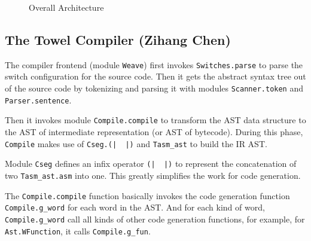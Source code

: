\documentclass{report}
\newcommand{\mtilde}[1]{\textasciitilde}
\begin{document}
\begin{figure}[H]
  \centering
  
  \caption{Overall Architecture}
  \label{fig:overall}
\end{figure}

\subsection{The Towel Compiler (Zihang Chen)}

  The compiler frontend (module \texttt{Weave}) first invokes \texttt{Switches.parse} to parse the switch configuration for the source code. Then it gets the abstract syntax tree out of the source code by tokenizing and parsing it with modules \texttt{Scanner.token} and \texttt{Parser.sentence}.

  Then it invokes module \texttt{Compile.compile} to transform the AST data structure to the AST of intermediate representation (or AST of bytecode). During this phase, \texttt{Compile} makes use of \texttt{Cseg.(|\mtilde ~\mtilde ~|)} and \texttt{Tasm\_ast} to build the IR AST.

  \begin{mdframed}[style=detail]
    Module \texttt{Cseg} defines an infix operator \texttt{(|\mtilde ~\mtilde ~|)} to represent the concatenation of two \texttt{Tasm\_ast.asm} into one. This greatly simplifies the work for code generation.

    The \texttt{Compile.compile} function basically invokes the code generation function \texttt{Compile.g\_word} for each word in the AST. And for each kind of word, \texttt{Compile.g\_word} call all kinds of other code generation functions, for example, for \texttt{Ast.WFunction}, it calls \texttt{Compile.g\_fun}.
  \end{mdframed}
\end{document}
